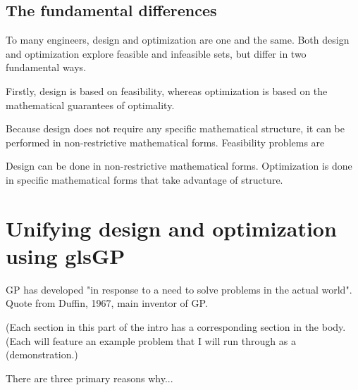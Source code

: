 \subsection{The fundamental differences}

To many engineers, design and optimization are one and the same. Both design and
optimization explore feasible and infeasible sets, but differ in two fundamental ways.

Firstly, design is based on feasibility, whereas optimization is based on the
mathematical guarantees of optimality.

Because design does not require any specific mathematical structure, it can
be performed in non-restrictive mathematical forms. Feasibility problems are

Design can be done in non-restrictive mathematical forms. Optimization is
done in specific mathematical forms that take advantage of structure.



\section{Unifying design and optimization using gls{GP}}

\gls{GP} has developed "in response to a need to solve problems in the actual 
world".~\cite{duffingp} Quote from Duffin, 1967, main inventor of GP.

(Each section in this part of the intro has a corresponding section in the body.
(Each will feature an example problem that I will run through as a
(demonstration.)

There are three primary reasons why...

